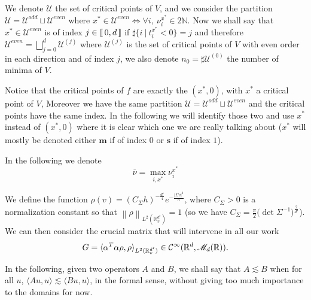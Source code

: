 \documentclass[12pt]{amsart}
\newcommand{\N}{\mathbb N}
\newcommand{\R}{\mathbb R}
\def\<{\langle}
\def\>{\rangle}
\numberwithin{equation}{section}
\numberwithin{figure}{section}
\def\m{\mathbf{m}}
\def\s{\mathbf{s}}
\newcommand{\vvert}[1]{\left\lVert#1\right\rVert}
\newcommand{\lb}{\operatorname{[\negthinspace [}}
\newcommand{\rb}{\operatorname{]\negthinspace ]}}
\def\uuu{{\mathcal U}}\def\vvv{{\mathcal V}}\def\www{{\mathcal W}}\def\xxx{{\mathcal X}}
\def\Mr{{\mathscr M}}\def\Nr{{\mathscr N}}\def\Or{{\mathscr O}}\def\Pr{{\mathscr P}}
\begin{document}
We denote $\uuu$ the set of critical points of $V$, and we consider the partition $\uuu = \uuu^{odd}\sqcup\uuu^{even}$ where $x^*\in\uuu^{even} \iff \forall i,\ \nu_i^{x^*}\in 2\N$. Now we shall say that $x^*\in\uuu^{even}$ is of index $j\in\lb0,d\rb$ if $\sharp\{i\ |\ t_i^{x^*}<0\}=j$ and therefore $\uuu^{even}=\bigsqcup_{j=0}^d\uuu^{(j)}$ where $\uuu^{(j)}$ is the set of critical points of $V$ with even order in each direction and of index $j$, we also denote $n_0=\sharp\uuu^{(0)}$ the number %
of minima of %
$V$.

Notice that the critical points of $f$ are exactly the $(x^*,0)$, with $x^*$ a critical point of $V$, Moreover we have the same partition $\uuu = \uuu^{odd}\sqcup\uuu^{even}$ and the critical points have the same index. In the following we will identify those two and use $x^*$ instead of $(x^*,0)$ where it is clear which one we are really talking about ($x^*$ will mostly be denoted either $\m$ if of index $0$ or $\s$ if of index $1$).

In the following we denote
\begin{equation}\label{eq:nubar}
\overline \nu = \max_{i,x^*}\nu_i^{x^*}
\end{equation}

We define the %
function $\rho(v) = (C_\Sigma h)^{-\frac{d'}{4}} e^{-\frac{|\Sigma v|^2}{h}}$, where $C_\Sigma > 0$ is a normalization constant so that $\vvert{\rho}_{L^2(\R^{d'}_v)} = 1$ (so %
we have $C_\Sigma = \frac{\pi}{2}\big(\det\Sigma^{-1}\big)^{\frac{2}{d'}}$). We can then consider the crucial matrix that will intervene in all our work
\begin{equation}\label{eq:defG}
G = \<\alpha^T\alpha\rho,\rho\>_{L^2(\R^{d'}_v)} \in \ccc^\infty(\R^d,\Mr_d(\R)).
\end{equation} 

In the following, given two operators $A$ and $B$, we shall say that $A\lesssim B$ when for all $u$, $\<Au,u\>\lesssim\<Bu,u\>$, in the formal sense, without giving too much importance to the domains for now.
\end{document}
